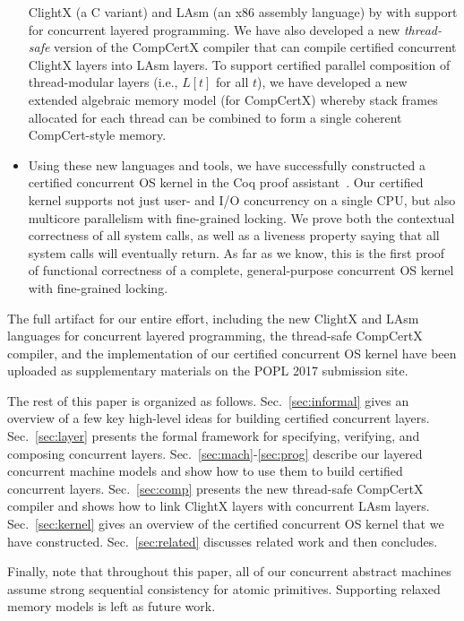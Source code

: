 \begin{itemize}
  ClightX (a C variant) and LAsm (an x86 assembly language) by
  \citet{dscal15} with support for concurrent layered programming.  We
  have also developed a new {\em thread-safe} version of the CompCertX
  compiler that can compile certified concurrent ClightX layers into
  LAsm layers.  To support certified parallel composition of
  thread-modular layers (i.e., $L[t]$ for all $t$), we have developed
  a new extended algebraic memory model (for CompCertX) whereby stack
  frames allocated for each thread can be combined to form a single
  coherent CompCert-style memory.
\item Using these new languages and tools, we have successfully
  constructed a certified concurrent OS kernel in the Coq proof
  assistant~\cite{coq}. Our certified kernel supports not just user-
  and I/O concurrency on a single CPU, but also multicore parallelism
  with fine-grained locking. We prove both the contextual
  correctness of all system calls, as well as a liveness property 
  saying that all system calls will eventually return.  As far as we 
  know, this is the first proof of functional correctness of a complete,
  general-purpose concurrent OS kernel with fine-grained locking.
\end{itemize}

The full artifact for our entire effort, including the new ClightX and
LAsm languages for concurrent layered programming, the thread-safe
CompCertX compiler, and the implementation of our certified concurrent
OS kernel have been uploaded as supplementary materials on the POPL
2017 submission site.

The rest of this paper is organized as follows.
Sec.~\ref{sec:informal} gives an overview of a few key high-level
ideas for building certified concurrent layers.  Sec.~\ref{sec:layer}
presents the formal framework for specifying, verifying, and composing
concurrent layers.  Sec.~\ref{sec:mach}-\ref{sec:prog}
describe our layered concurrent machine models and  
show how to use them to build certified
concurrent layers.  Sec.~\ref{sec:comp} presents the new thread-safe
CompCertX compiler and shows how to link ClightX layers
with concurrent LAsm layers.  Sec.~\ref{sec:kernel} gives an overview
of the certified concurrent OS kernel that we have constructed.
Sec.~\ref{sec:related} discusses related work and then concludes.

Finally, note that throughout this paper, all of our concurrent 
abstract machines assume strong sequential consistency for atomic 
primitives. Supporting relaxed memory models is left as future work. 



